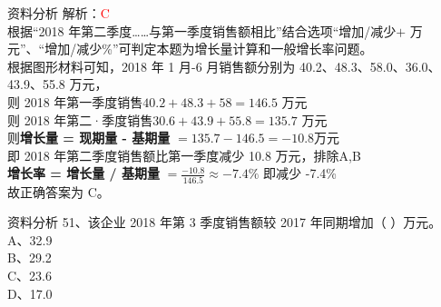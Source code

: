 \documentclass[aspectratio=169]{beamer}
\begin{document}
\begin{frame}[t]{资料分析}
    解析：\textcolor{red}{C}\\
    根据“2018 年第二季度……与第一季度销售额相比”结合选项“增加/减少$+$ 万元”、“增加/减少\%”可判定本题为增长量计算和一般增长率问题。\\
    根据图形材料可知，2018 年 1 月-6 月销售额分别为 40.2、48.3、58.0、36.0、43.9、55.8 万元，\\
    则 2018 年第一季度销售$40.2+48.3+58=146.5$ 万元\\
    则 2018 年第二·季度销售$30.6+43.9+55.8=135.7$ 万元\\
    则\textbf{增长量 = 现期量 - 基期量}  $ = 135.7 - 146.5 =-10.8$万元\\
    即 2018 年第二季度销售额比第一季度减少 10.8 万元，排除A,B\\
    \textbf{增长率 = 增长量 / 基期量} $= \frac{-10.8}{146.5}  \approx -7.4\%$ 即减少 -7.4\%\\
    故正确答案为 C。\\

\end{frame}                           



\begin{frame}[t]{资料分析}
    51、该企业 2018 年第 3 季度销售额较 2017 年同期增加（ ）万元。  \\
    A、32.9                                                         \\
    B、29.2                                                         \\
    C、23.6                                                         \\ 
    D、17.0                                                         \\
\end{frame}                           
\end{document}
